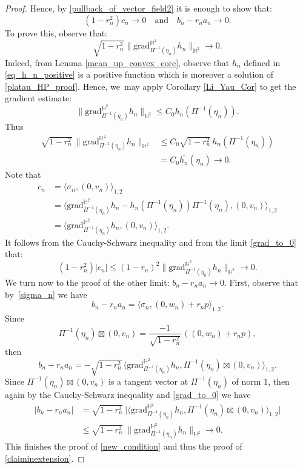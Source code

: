 \documentclass[11pt]{article}
\theoremstyle{plain}
\theoremstyle{definition}
\newcommand{\grad}{\mathrm{grad}^{\mathbb{H}^2}}
\newcommand{\inner}[1] {\langle #1 \rangle}
\begin{document}
\begin{proof}
Hence, by \eqref{pullback_of_vector_field2} it is enough to show that:
\begin{equation}\label{new_condition}
(1 - r_n^2) c_n \to 0 \quad \text{and} \quad b_n - r_n a_n \to 0.
\end{equation}
To prove this, observe that:
\begin{equation}\label{grad_to_0}
\sqrt{1 - r_n^2} \lVert \grad_{\Pi^{-1}(\eta_n)} h_n \rVert_{\mathbb{H}^2} \to 0.
\end{equation}
Indeed, from Lemma \ref{mean_up_convex_core}, observe that \(h_n\) defined in \eqref{eq_h_n_positive} is a positive function which is moreover a solution of \eqref{platau_HP_proof}. Hence, we~may apply Corollary \ref{Li_Yau_Cor} to get the gradient estimate:
\[
\lVert \grad_{\Pi^{-1}(\eta_n)} h_n\rVert_{\mathbb{H}^2}\leq C_0 h_n(\Pi^{-1}(\eta_n)).
\]
Thus \begin{align*}
\sqrt{1-r_n^2}\,\lVert\grad_{\Pi^{-1}(\eta_n)} h_n\rVert_{\mathbb{H}^2}&\leq C_0\sqrt{1-r_n^2}\,h_n(\Pi^{-1}(\eta_n))\\
&=C_0\overline{h_n}(\eta_n)\to 0.
\end{align*}
Note that \begin{align*}
c_n&=\inner{\sigma_n,(0,v_n)}_{1,2}\\
&=\inner{\grad_{\Pi^{-1}(\eta_n)}h_n-h_n(\Pi^{-1}(\eta_n))\Pi^{-1}(\eta_n),(0,v_n)}_{1,2}\\
&= \inner{\grad_{\Pi^{-1}(\eta_n)}h_n,(0,v_n)}_{1,2}.
\end{align*} It follows from the Cauchy-Schwarz inequality and from the limit \eqref{grad_to_0} that:
\[
(1-r_n^2)\lvert c_n\rvert\leq (1-r_n)^2\lVert\grad_{\Pi^{-1}(\eta_n)}h_n\rVert_{\mathbb{H}^2} \to 0.
\]
We turn now to the proof of the other limit: $b_n-r_na_n\to 0$. First, observe that by~\eqref{sigma_n} we have
\[
b_n-r_na_n=\inner{\sigma_n,(0,w_n)+r_np}_{1,2}.
\]
Since
\[
\Pi^{-1}(\eta_n)\boxtimes(0,v_n)=\frac{-1}{\sqrt{1-r_n^2}}\,((0,w_n)+r_np),
\]
then
\[
b_n-r_na_n=-\sqrt{1-r_n^{2}}\,\inner{\grad_{\Pi^{-1}(\eta_n)}h_n,\Pi^{-1}(\eta_n)\boxtimes (0,v_n)}_{1,2}.
\]
Since $\Pi^{-1}(\eta_n)\boxtimes (0,v_n)$ is a tangent vector at $\Pi^{-1}(\eta_n)$ of norm $1$, then again by the Cauchy-Schwarz inequality and \eqref{grad_to_0} we have
\begin{align*}
\lvert b_n-r_na_n\rvert&=\sqrt{1-r_n^{2}}\ \lvert\inner{\grad_{\Pi^{-1}(\eta_n)}h_n,\Pi^{-1}(\eta_n)\boxtimes (0,v_n)}_{1,2}\vert\\
&\leq \sqrt{1-r_n^{2}}\ \lVert \grad_{\Pi^{-1}(\eta_n)}h_n\rVert_{\mathbb{H}^2}\to 0.
\end{align*}
This finishes the proof of \eqref{new_condition} and thus the proof of \eqref{claiminextension}.


\end{proof}
\end{document}
